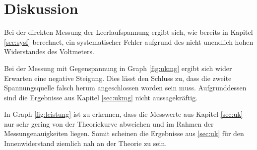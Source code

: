 \section{Diskussion}
Bei der direkten Messung der Leerlaufspannung ergibt sich, wie bereits in Kapitel \ref{sec:sysf}
berechnet, ein systematischer Fehler aufgrund des nicht unendlich hohen Widerstandes des Voltmeters.

Bei der Messung mit Gegenspannung in Graph \ref{fig:ukmg} ergibt sich wider Erwarten eine
negative Steigung. Dies lässt den Schluss zu, dass die zweite Spannungsquelle falsch herum angeschlossen
worden sein muss. Aufgrunddessen sind die Ergebnisse aus Kapitel \ref{sec:ukmg} nicht aussagekräftig.

In Graph \ref{fig:leistung} ist zu erkennen, dass die Messwerte aus Kapitel \ref{sec:uk}
nur sehr gering von der Theoriekurve abweichen und im Rahmen der Messungenauigkeiten liegen.
Somit scheinen die Ergebnisse aus \ref{sec:uk} für den Innenwiderstand ziemlich nah an der Theorie zu sein.
